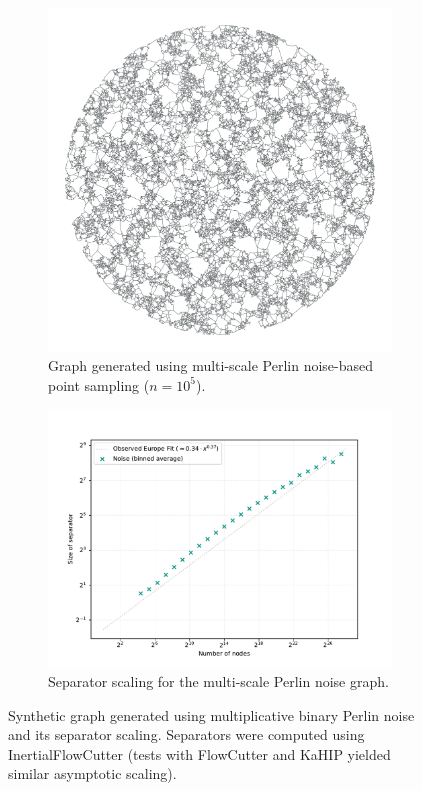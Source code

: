 \begin{figure}[tbhp]
	\centering
	\begin{subfigure}[t]{0.38\linewidth}
		\centering
		\includegraphics[width=\linewidth]{graphics/noise.png}
        \caption{Graph generated using multi-scale Perlin noise-based point sampling (\({n = 10^5}\)).}
		\label{fig:fractal_noise_graph_viz}
	\end{subfigure}
	\hfill
	\begin{subfigure}[t]{0.55\linewidth}
		\centering
		\includegraphics[width=\linewidth]{graphics/noise_10m.pdf}
		\caption{Separator scaling for the multi-scale Perlin noise graph.}
		\label{fig:fractal_noise_graph_sep_plot}
	\end{subfigure}
	\caption{Synthetic graph generated using multiplicative binary Perlin noise and its separator scaling. Separators were computed using InertialFlowCutter (tests with FlowCutter and KaHIP yielded similar asymptotic scaling).}
	\label{fig:fractal_noise_graph_results}
\end{figure}

